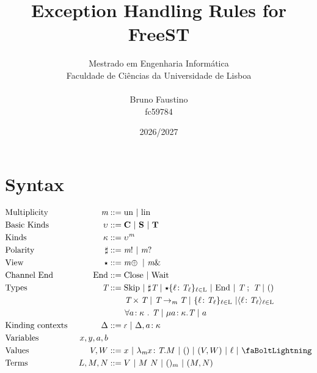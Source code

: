\documentclass[a4paper,11pt]{article}
\title{\color{blue}
  Exception Handling Rules for FreeST}
\author{Mestrado em Engenharia Informática\\
  Faculdade de Ciências da Universidade de Lisboa\\ \\
  Bruno Faustino\\
  fc59784}
\date{2026/2027}
\newcommand{\zap}{\text{\faBoltLightning}}
\newcommand{\un}{\text{un}}
\newcommand{\lin}{\text{lin}}
\newcommand{\Skip}{\text{Skip}}
\newcommand{\mbf}[1]{\mathbf{#1}}
\newcommand{\Ckind}{\mbf{C}}
\newcommand{\Skind}{\mbf{S}}
\newcommand{\Tkind}{\mbf{T}}
\newcommand{\End}{\text{End}}
\newcommand{\Close}{\text{Close}}
\newcommand{\Wait}{\text{Wait}}
\newcommand{\mcal}[1]{\mathcal{#1}}
\newcommand{\m}{\textit{\text{m}}}
\newcommand{\bkind}{\upsilon}
\newcommand{\kind}{\kappa}
\newcommand{\T}{\textit{\text{T}}}
\newcommand{\labelset}{\text{L}}
\newcommand{\pol}{\sharp}
\newcommand{\view}{\scalerel*{\bigstar}{\kind}}
\newcommand{\viewsend}{\oplus}
\newcommand{\viewreceive}{\text{\&}}
\newcommand{\lbl}{\ell}
\newcommand{\record}{\{\lbl\! : \T_\lbl\}_{\lbl \in \labelset}}
\newcommand{\variant}{\langle \lbl\! : \T_\lbl\rangle_{\lbl \in \labelset}}
\newcommand{\foralll}[3]{\forall #1\! : #2~.~#3}
\newcommand{\recursion}[3]{\mu #1\! : #2.#3}
\newcommand{\kindctx}{\Delta}
\newcommand{\bind}[3]{#1,#2\! : #3}
\newcommand{\empt}{\scalerel*{\mcal{E}}{\epsilon}}
\newcommand{\abs}[4]{\lambda_#1 #2\! : #3.#4}
\newcommand{\pair}[2]{#1 \times #2}
\theoremstyle{plain}
\theoremstyle{nonumberplain}
\begin{document}
\maketitle
\setlength{\parskip}{0pt}
\setlength{\parindent}{0pt}
\thispagestyle{empty}
\tableofcontents


\section{Syntax}

\begin{align*}
  & \text{Multiplicity}           &~ \m       & ::= \un~|~\lin                                                        \\
  & \text{Basic Kinds}            &~ \bkind   & ::= \Ckind~|~\Skind~|~\Tkind                                          \\
  & \text{Kinds}                  &~ \kind    & ::= \bkind^\m                                                         \\
  & \text{Polarity}               &~ \pol     & ::= \m!~|~\m?                                                         \\
  & \text{View}                   &~ \view    & ::= \m\!\viewsend~|~\m\viewreceive                                    \\
  & \text{Channel End}            &~ \End     & ::= \Close~|~\Wait                                                    \\
  & \text{Types}                  &~ \T       & ::= \Skip~|~\pol\T~|~\view\record~|~\End~|~\T~;~\T~|~()               \\
                                &&& \phantom{~::=~} \pair{\T}{\T}~|~\T \rightarrow_\m \T~|~\record~|\variant          \\
                                &&& \phantom{~::=~} \foralll{a}{\kind}{\T}~|~\recursion{a}{\kind}{\T}~|~a             \\
  & \text{Kinding contexts}       &~ \kindctx & ::= \empt~|~\bind{\kindctx}{a}{\kind}                                 \\
  & \text{Variables}              &~ x,y,a,b                                                                          \\
  & \text{Values}                 &~ V,W      & ::= x~|~\abs{\m}{x}{\T}{M}~|~()~|~(V,W)~|~\lbl~|~\zap                 \\
  & \text{Terms}                  &~ L,M,N    & ::= V~|~M~N~|~()_m~|~(M,N)                                            \\

\end{align*}
\end{document}
